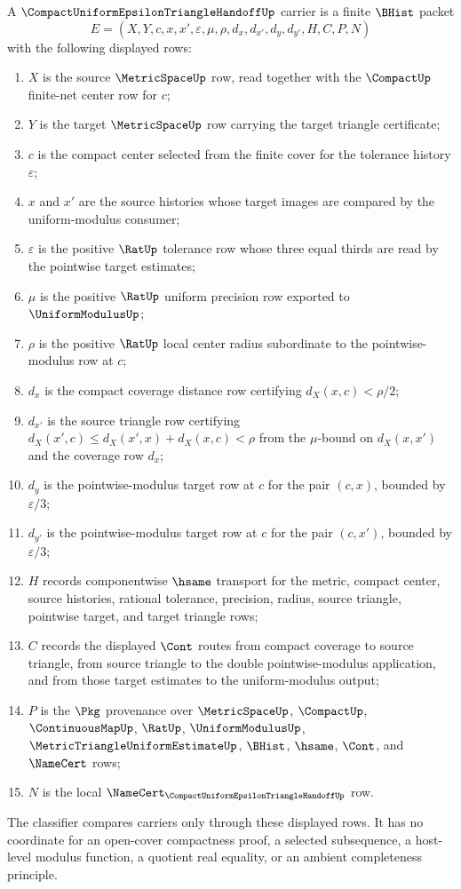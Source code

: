 \begin{definition}
\label{def:compact-uniform-epsilon-triangle-handoff-carrier}
A $\CompactUniformEpsilonTriangleHandoffUp$ carrier is a finite $\BHist$ packet
$$
E=(X,Y,c,x,x',\varepsilon,\mu,\rho,d_x,d_{x'},d_y,d_{y'},H,C,P,N)
$$
with the following displayed rows:
\begin{enumerate}
\item $X$ is the source $\MetricSpaceUp$ row, read together with the $\CompactUp$ finite-net center row for $c$;
\item $Y$ is the target $\MetricSpaceUp$ row carrying the target triangle certificate;
\item $c$ is the compact center selected from the finite cover for the tolerance history $\varepsilon$;
\item $x$ and $x'$ are the source histories whose target images are compared by the uniform-modulus consumer;
\item $\varepsilon$ is the positive $\RatUp$ tolerance row whose three equal thirds are read by the pointwise target estimates;
\item $\mu$ is the positive $\RatUp$ uniform precision row exported to $\UniformModulusUp$;
\item $\rho$ is the positive $\RatUp$ local center radius subordinate to the pointwise-modulus row at $c$;
\item $d_x$ is the compact coverage distance row certifying $d_X(x,c)<\rho/2$;
\item $d_{x'}$ is the source triangle row certifying $d_X(x',c) \le d_X(x',x)+d_X(x,c)<\rho$ from the $\mu$-bound on $d_X(x,x')$ and the coverage row $d_x$;
\item $d_y$ is the pointwise-modulus target row at $c$ for the pair $(c,x)$, bounded by $\varepsilon/3$;
\item $d_{y'}$ is the pointwise-modulus target row at $c$ for the pair $(c,x')$, bounded by $\varepsilon/3$;
\item $H$ records componentwise $\hsame$ transport for the metric, compact center, source histories, rational tolerance, precision, radius, source triangle, pointwise target, and target triangle rows;
\item $C$ records the displayed $\Cont$ routes from compact coverage to source triangle, from source triangle to the double pointwise-modulus application, and from those target estimates to the uniform-modulus output;
\item $P$ is the $\Pkg$ provenance over $\MetricSpaceUp$, $\CompactUp$, $\ContinuousMapUp$, $\RatUp$, $\UniformModulusUp$, $\MetricTriangleUniformEstimateUp$, $\BHist$, $\hsame$, $\Cont$, and $\NameCert$ rows;
\item $N$ is the local $\NameCert_{\CompactUniformEpsilonTriangleHandoffUp}$ row.
\end{enumerate}
The classifier compares carriers only through these displayed rows. It has no coordinate for an open-cover compactness proof, a selected subsequence, a host-level modulus function, a quotient real equality, or an ambient completeness principle.
\end{definition}
